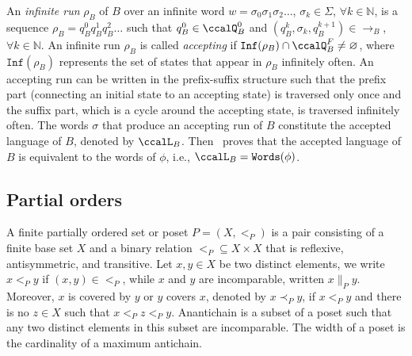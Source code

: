 \documentclass[Afour,sageh,times]{sagej}
\begin{document}
An \textit{infinite run} $\rho_B$ of $B$ over an infinite word $w=\sigma_0\sigma_1\sigma_2\dots$, $\sigma_k\in\Sigma$, $\forall k\in\mathbb{N}$, is a sequence $\rho_B=q_B^0q_B^1q_B^2\dots$ such that $q_B^0\in\ccalQ_B^0$ and $(q_B^{k},\sigma_k,q_B^{k+1})\in\rightarrow_{B}$, $\forall k\in\mathbb{N}$.
An infinite run $\rho_B$ is called \textit{accepting} if $\texttt{Inf}(\rho_B)\cap\ccalQ_B^F\neq\varnothing$, where $\texttt{Inf}(\rho_B)$ represents the set of states that appear in $\rho_B$ infinitely often. An accepting run can be written in the prefix-suffix structure such that the prefix part (connecting an initial state to an  accepting state) is traversed only once and the suffix part, which is a cycle around the accepting state, is traversed infinitely often.
The words $\sigma$ that produce an accepting run of $B$ constitute the accepted language of $B$, denoted by $\ccalL_B$. Then~\cite{baier2008principles} proves that the accepted language of $B$ is equivalent to the words of $\phi$, i.e., $\ccalL_B=\texttt{Words}(\phi)$.

\subsection{Partial orders}\label{sec:partial}
A finite partially ordered set or poset $P = (X, <_P )$  is a pair consisting of a finite base set $X$ and a binary relation $<_P \subseteq X \times X$ that is reflexive, antisymmetric, and transitive. Let  $x, y \in X$ be two distinct elements, we write $x <_P y$ if $(x,y) \in <_P$, while $x$ and $y$ are incomparable, written $x \|_P y$. Moreover, $x$ is covered by $y$ or $y$ covers $x$, denoted by $x \prec_P y$, if $x<_P  y$ and there is no $z \in X$ such that $x  <_P  z <_P y$. Anantichain is a subset of a poset such that any two distinct elements in this subset are incomparable. The width of a poset is the cardinality of a maximum antichain. %
\end{document}

